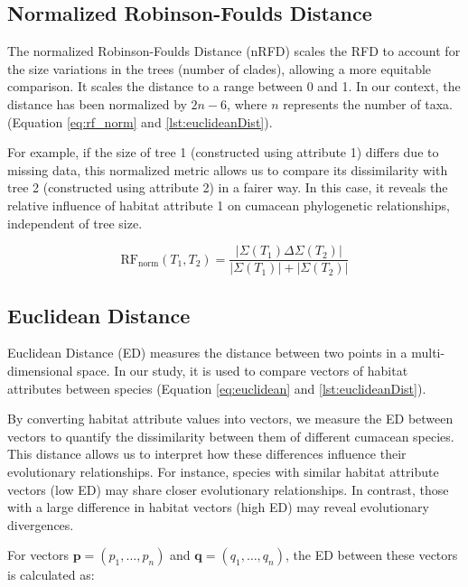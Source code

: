 \subsection{Normalized Robinson-Foulds Distance}\label{RFnorm}

The normalized Robinson-Foulds Distance (nRFD) scales the RFD to account for the size variations in the trees (number of clades), allowing a more equitable comparison. It scales the distance to a range between 0 and 1. In our context, the distance has been normalized by $2n-6$, where $n$ represents the number of taxa. (Equation \eqref{eq:rf_norm} and \autoref{lst:euclideanDist}).

For example, if the size of tree 1 (constructed using attribute 1) differs due to missing data, this normalized metric allows us to compare its dissimilarity with tree 2 (constructed using attribute 2) in a fairer way. In this case, it reveals the relative influence of habitat attribute 1 on cumacean phylogenetic relationships, independent of tree size.

\begin{equation}\label{eq:rf_norm}
    \text{RF}_{\text{norm}}(T_1, T_2) = \frac{| \Sigma(T_1) \Delta \Sigma(T_2) |}{| \Sigma(T_1) | + | \Sigma(T_2) |}
\end{equation}

\subsection{Euclidean Distance}\label{euclidean}

Euclidean Distance (ED) measures the distance between two points in a multi-dimensional space. In our study, it is used to compare vectors of habitat attributes between species (Equation \eqref{eq:euclidean} and \autoref{lst:euclideanDist}).

By converting habitat attribute values into vectors, we measure the ED between vectors to quantify the dissimilarity between them of different cumacean species. This distance allows us to interpret how these differences influence their evolutionary relationships. For instance, species with similar habitat attribute vectors (low ED) may share closer evolutionary relationships. In contrast, those with a large difference in habitat vectors (high ED) may reveal evolutionary divergences.

For vectors $\mathbf{p} = (p_1, \ldots, p_n)$ and $\mathbf{q} = (q_1, \ldots, q_n)$, the ED between these vectors is calculated as:

